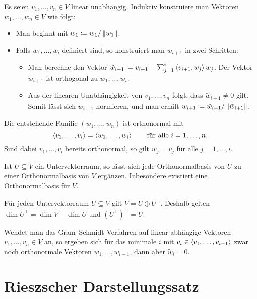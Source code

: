 Es seien $v_1, \dotsc, v_n \in V$ linear unabhängig.
Induktiv konstruiere man Vektoren $w_1, \dotsc, w_n \in V$ wie folgt:
\begin{itemize}
  \item
    Man beginnt mit $w_1 \coloneqq w_1 / \left\| w_1 \right\|$.
  \item
    Falls $w_1, \dotsc, w_i$ definiert sind, so konstruiert man $w_{i+1}$ in zwei Schritten:
    \begin{itemize}
      \item
        Man berechne den Vektor $\tilde{w}_{i+1} \coloneqq v_{i+1} - \sum_{j=1}^i \left\langle v_{i+1}, w_j \right\rangle w_j$.
        Der Vektor $\tilde{w}_{i+1}$ ist orthogonal zu $w_1, \dotsc, w_i$.
      \item
        Aus der linearen Unabhängigkeit von $v_1, \dotsc, v_n$ folgt, dass $\tilde{w}_{i+1} \neq 0$ gilt.
        Somit lässt sich $\tilde{w}_{i+1}$ normieren, und man erhält $w_{i+1} \coloneqq \tilde{w}_{i+1} / \left\| \tilde{w}_{i+1} \right\|$.
    \end{itemize}
\end{itemize}
Die entstehende Familie $(w_1, \dotsc, w_n)$ ist orthonormal mit
\[
    \left\langle v_1, \dotsc, v_i \right\rangle
  = \left\langle w_1, \dotsc, w_i \right\rangle
  \qquad
  \text{für alle $i = 1, \dotsc, n$}.
\]
Sind dabei $v_1, \dotsc, v_i$ bereits orthonormal, so gilt $w_j = v_j$ für alle $j = 1, \dotsc, i$.

\begin{theorem}
  Ist $U \subseteq V$ ein Untervektorraum, so lässt sich jede Orthonormalbasis von $U$ zu einer Orthonormalbasis von $V$ ergänzen.
  Inbesondere existiert eine Orthonormalbasis für $V$.
\end{theorem}

\begin{corollary}
  Für jeden Untervektorraum $U \subseteq V$ gilt $V = U \oplus U^\perp$.
  Deshalb gelten $\dim U^\perp = \dim V - \dim U$ und $(U^\perp)^\perp = U$.
\end{corollary}

\begin{remark}
  Wendet man das Gram--Schmidt Verfahren auf linear abhängige Vektoren $v_1, \dotsc, v_n \in V$ an, so ergeben sich für das minimale $i$ mit $v_i \in \left\langle v_1, \dotsc, v_{i-1} \right\rangle$ zwar noch orthonormale Vektoren $w_1, \dotsc, w_{i-1}$, dann aber $\tilde{w}_i = 0$.
\end{remark}





\section{Rieszscher Darstellungssatz}

